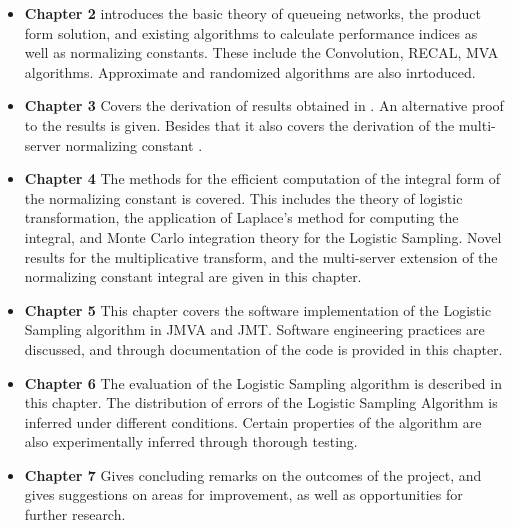 \begin{itemize}[leftmargin=*]
    \item \textbf{Chapter 2} introduces the basic theory of queueing networks, the product form solution, and existing algorithms to calculate performance indices as well as normalizing constants. These include the Convolution, RECAL, MVA algorithms. Approximate and randomized algorithms are also inrtoduced.
    \item \textbf{Chapter 3} Covers the derivation of results obtained in \cite{Casale2017AcceleratingMethods}. An alternative proof to the results is given. Besides that it also covers the derivation of the multi-server normalizing constant \cite{Casale2018ExplicitRepresentations}.
    \item \textbf{Chapter 4} The methods for the efficient computation of the integral form of the normalizing constant is covered. This includes the theory of logistic transformation, the application of Laplace's method for computing the integral, and Monte Carlo integration theory for the Logistic Sampling. Novel results for the multiplicative transform, and the multi-server extension of the normalizing constant integral are given in this chapter.
    \item \textbf{Chapter 5} This chapter covers the software implementation of the Logistic Sampling algorithm in JMVA and JMT. Software engineering practices are discussed, and through documentation of the code is provided in this chapter.
    \item \textbf{Chapter 6} The evaluation of the Logistic Sampling algorithm is described in this chapter. The distribution of errors of the Logistic Sampling Algorithm is inferred under different conditions. Certain properties of the algorithm are also experimentally inferred through thorough testing.
    \item \textbf{Chapter 7} Gives concluding remarks on the outcomes of the project, and gives suggestions on areas for improvement, as well as opportunities for further research.
\end{itemize}
